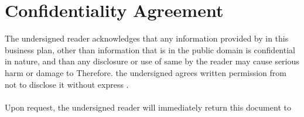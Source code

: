 \section*{Confidentiality Agreement}
The undersigned reader acknowledges that any information provided by
\underline{\companyName{}} in this business plan, other than information that is in the public domain is confidential in nature, and than any disclosure or use of same by the reader may cause serious harm or damage to \underline{\companyName{}} Therefore. the undersigned agrees written permission from not to disclose it without express \underline{\companyName{}}.
\\\\
Upon request, the undersigned reader will immediately return this document to \underline{\companyName{}}
